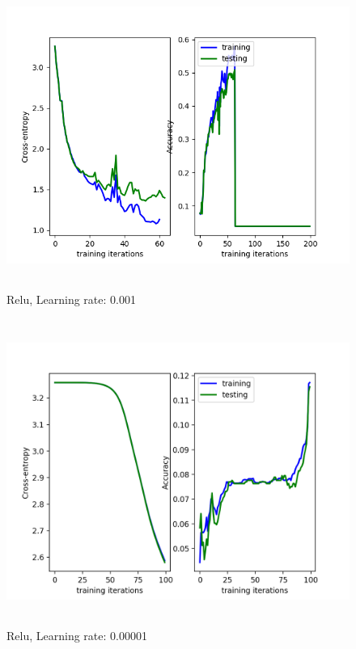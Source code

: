 \documentclass[a4paper]{article}
\begin{document}
   \begin{figure}[h]
\caption{Relu, Learning rate: 0.001}
\centering
\includegraphics[width=12cm, height=10cm]{RELU001.png}
\end{figure}
    

\begin{figure}[h]
\caption{Relu, Learning rate: 0.00001}
\centering
\includegraphics[width=12cm, height=10cm]{LR00001.png}
\end{figure}
\end{document}
